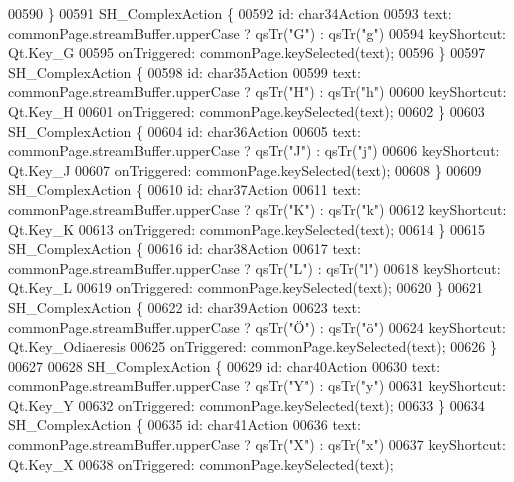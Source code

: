 \begin{DoxyCode}
00590     \}
00591     SH\_ComplexAction \{
00592         \textcolor{keywordtype}{id}: char34Action
00593         text: commonPage.streamBuffer.upperCase ? qsTr(\textcolor{stringliteral}{"G"}) : qsTr(\textcolor{stringliteral}{"g"})
00594         keyShortcut: Qt.Key\_G
00595         onTriggered: commonPage.keySelected(text);
00596     \}
00597     SH\_ComplexAction \{
00598         \textcolor{keywordtype}{id}: char35Action
00599         text: commonPage.streamBuffer.upperCase ? qsTr(\textcolor{stringliteral}{"H"}) : qsTr(\textcolor{stringliteral}{"h"})
00600         keyShortcut: Qt.Key\_H
00601         onTriggered: commonPage.keySelected(text);
00602     \}
00603     SH\_ComplexAction \{
00604         \textcolor{keywordtype}{id}: char36Action
00605         text: commonPage.streamBuffer.upperCase ? qsTr(\textcolor{stringliteral}{"J"}) : qsTr(\textcolor{stringliteral}{"j"})
00606         keyShortcut: Qt.Key\_J
00607         onTriggered: commonPage.keySelected(text);
00608     \}
00609     SH\_ComplexAction \{
00610         \textcolor{keywordtype}{id}: char37Action
00611         text: commonPage.streamBuffer.upperCase ? qsTr(\textcolor{stringliteral}{"K"}) : qsTr(\textcolor{stringliteral}{"k"})
00612         keyShortcut: Qt.Key\_K
00613         onTriggered: commonPage.keySelected(text);
00614     \}
00615     SH\_ComplexAction \{
00616         \textcolor{keywordtype}{id}: char38Action
00617         text: commonPage.streamBuffer.upperCase ? qsTr(\textcolor{stringliteral}{"L"}) : qsTr(\textcolor{stringliteral}{"l"})
00618         keyShortcut: Qt.Key\_L
00619         onTriggered: commonPage.keySelected(text);
00620     \}
00621     SH\_ComplexAction \{
00622         \textcolor{keywordtype}{id}: char39Action
00623         text: commonPage.streamBuffer.upperCase ? qsTr(\textcolor{stringliteral}{"Ö"}) : qsTr(\textcolor{stringliteral}{"ö"})
00624         keyShortcut: Qt.Key\_Odiaeresis
00625         onTriggered: commonPage.keySelected(text);
00626     \}
00627 
00628     SH\_ComplexAction \{
00629         \textcolor{keywordtype}{id}: char40Action
00630         text: commonPage.streamBuffer.upperCase ? qsTr(\textcolor{stringliteral}{"Y"}) : qsTr(\textcolor{stringliteral}{"y"})
00631         keyShortcut: Qt.Key\_Y
00632         onTriggered: commonPage.keySelected(text);
00633     \}
00634     SH\_ComplexAction \{
00635         \textcolor{keywordtype}{id}: char41Action
00636         text: commonPage.streamBuffer.upperCase ? qsTr(\textcolor{stringliteral}{"X"}) : qsTr(\textcolor{stringliteral}{"x"})
00637         keyShortcut: Qt.Key\_X
00638         onTriggered: commonPage.keySelected(text);

\end{DoxyCode}
